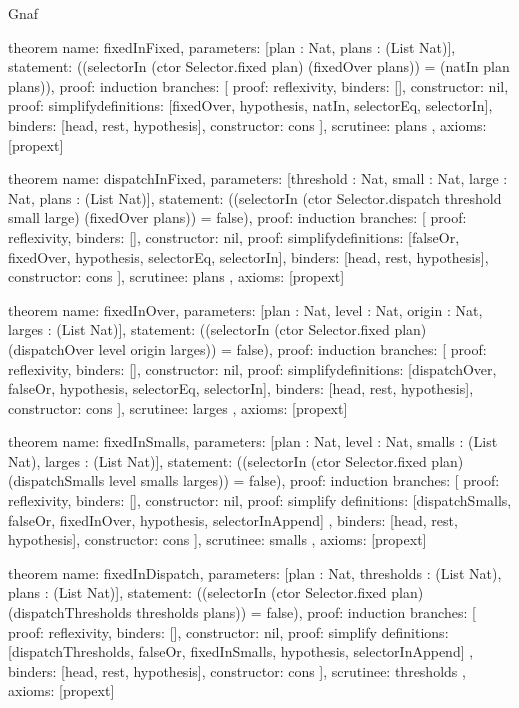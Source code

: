 \begin{lexlean}{Gnaf}
\begin{semanticmodule}
theorem{
  name: fixedInFixed,
  parameters: [plan : Nat, plans : (List Nat)],
  statement: ((selectorIn (ctor Selector.fixed plan) (fixedOver plans)) = (natIn plan plans)),
  proof: induction{
    branches: [
      {proof: reflexivity{}, binders: [], constructor: nil},
      {
        proof: simplify{definitions: [fixedOver, hypothesis, natIn, selectorEq, selectorIn]},
        binders: [head, rest, hypothesis],
        constructor: cons
      }
    ],
    scrutinee: plans
  },
  axioms: [propext]
}

theorem{
  name: dispatchInFixed,
  parameters: [threshold : Nat, small : Nat, large : Nat, plans : (List Nat)],
  statement: ((selectorIn (ctor Selector.dispatch threshold small large) (fixedOver plans)) = false),
  proof: induction{
    branches: [
      {proof: reflexivity{}, binders: [], constructor: nil},
      {
        proof: simplify{definitions: [falseOr, fixedOver, hypothesis, selectorEq, selectorIn]},
        binders: [head, rest, hypothesis],
        constructor: cons
      }
    ],
    scrutinee: plans
  },
  axioms: [propext]
}

theorem{
  name: fixedInOver,
  parameters: [plan : Nat, level : Nat, origin : Nat, larges : (List Nat)],
  statement: ((selectorIn (ctor Selector.fixed plan) (dispatchOver level origin larges)) = false),
  proof: induction{
    branches: [
      {proof: reflexivity{}, binders: [], constructor: nil},
      {
        proof: simplify{definitions: [dispatchOver, falseOr, hypothesis, selectorEq, selectorIn]},
        binders: [head, rest, hypothesis],
        constructor: cons
      }
    ],
    scrutinee: larges
  },
  axioms: [propext]
}

theorem{
  name: fixedInSmalls,
  parameters: [plan : Nat, level : Nat, smalls : (List Nat), larges : (List Nat)],
  statement: ((selectorIn (ctor Selector.fixed plan) (dispatchSmalls level smalls larges)) = false),
  proof: induction{
    branches: [
      {proof: reflexivity{}, binders: [], constructor: nil},
      {
        proof: simplify{
          definitions: [dispatchSmalls, falseOr, fixedInOver, hypothesis, selectorInAppend]
        },
        binders: [head, rest, hypothesis],
        constructor: cons
      }
    ],
    scrutinee: smalls
  },
  axioms: [propext]
}

theorem{
  name: fixedInDispatch,
  parameters: [plan : Nat, thresholds : (List Nat), plans : (List Nat)],
  statement: ((selectorIn (ctor Selector.fixed plan) (dispatchThresholds thresholds plans)) = false),
  proof: induction{
    branches: [
      {proof: reflexivity{}, binders: [], constructor: nil},
      {
        proof: simplify{
          definitions: [dispatchThresholds, falseOr, fixedInSmalls, hypothesis, selectorInAppend]
        },
        binders: [head, rest, hypothesis],
        constructor: cons
      }
    ],
    scrutinee: thresholds
  },
  axioms: [propext]
}


\end{semanticmodule}
\end{lexlean}
